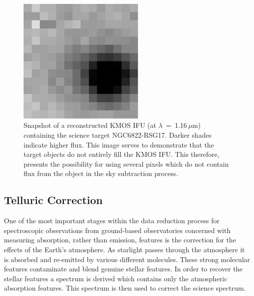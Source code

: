 \begin{figure}
 \centering
\includegraphics[width=0.55\textwidth]{ngc6822/N6822_RSG17-snapshot}
 \caption[IFU Snapshot]{
          Snapshot of a reconstructed KMOS IFU (at $\lambda$~=~1.16\,$\mu$m) containing the science target NGC6822-RSG17.
          Darker shades indicate higher flux.
          This image serves to demonstrate that the target objects do not entirely fill the KMOS IFU.
          This therefore, presents the possibility for using several pixels which do not contain flux from the object in the sky subtraction process.
          }
 \label{fig:IFU_snapshot}
\end{figure}


\subsection{Telluric Correction} %
\label{sub:telluric_correction}

One of the most important stages within the data reduction process for spectroscopic observations from ground-based observatories concerned with measuring absorption, rather than emission, features is the correction for the effects of the Earth's atmosphere.
As starlight passes through the atmosphere it is absorbed and re-emitted by various different molecules.
These strong molecular features contaminate and blend genuine stellar features.
In order to recover the stellar features a spectrum is derived which contains only the atmospheric absorption features.
This spectrum is then used to correct the science spectrum.

